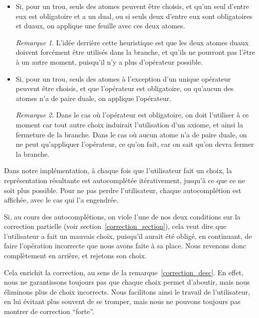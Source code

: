 \documentclass[11pt,a4paper]{article}
\theoremstyle{plain}
\theoremstyle{definition}
\theoremstyle{remark}
\newtheorem{remark}{Remarque}
\begin{document}
\begin{itemize}
    \item Si, pour un trou, seuls des atomes peuvent être choisis, et qu'un seul d'entre eux est obligatoire et a un dual, ou si seuls deux d'entre eux sont obligatoires et duaux, on applique une feuille avec ces deux atomes.

    \begin{remark}
        L'idée derrière cette heuristique est que les deux atomes duaux doivent forcément être utilisés dans la branche, et qu'ils ne pourront pas l'être à un autre moment, puisqu'il n'y a plus d'opérateur possible.
    \end{remark}

    \item Si, pour un trou, seuls des atomes à l'exception d'un unique opérateur peuvent être choisis, et que l'opérateur est obligatoire, ou qu'aucun des atomes n'a de paire duale, on applique l'opérateur.

    \begin{remark}
        Dans le cas où l'opérateur est obligatoire, on doit l'utiliser à ce moment car tout autre choix induirait l'utilisation d'un axiome, et ainsi la fermeture de la branche. Dans le cas où aucun atome n'a de paire duale, on ne peut qu'appliquer l'opérateur, ce qu'on fait, car on sait qu'on devra fermer la branche.
    \end{remark}
\end{itemize}

Dans notre implémentation, à chaque fois que l'utilisateur fait un choix, la représentation résultante est autocomplétée itérativement, jusqu'à ce que ce ne soit plus possible. Pour ne pas perdre l'utilisateur, chaque autocomplétion est affichée, avec le cas qui l'a engendrée.

Si, au cours des autocomplétions, on viole l'une de nos deux conditions sur la correction partielle (voir section~\ref{correction_section}), cela veut dire que l'utilisateur a fait un mauvais choix, puisqu'il aurait été obligé, en continuant, de faire l'opération incorrecte que nous avons faite à sa place. Nous revenons donc complètement en arrière, et rejetons son choix.

Cela enrichit la correction, au sens de la remarque~\ref{correction_desc}. En effet, nous ne garantissons toujours pas que chaque choix permet d'aboutir, mais nous éliminons plus de choix incorrects. Nous facilitons ainsi le travail de l'utilisateur, en lui évitant plus souvent de se tromper, mais nous ne pouvons toujours pas montrer de correction ``forte''.
\end{document}
